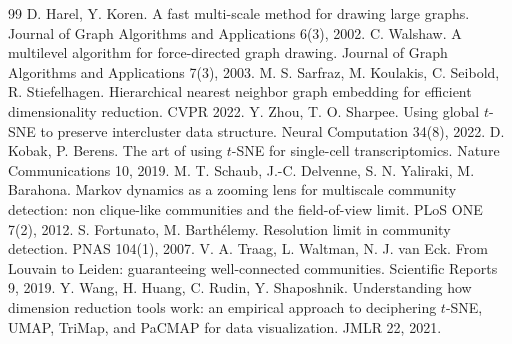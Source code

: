 \documentclass[11pt]{article}
\begin{document}
\begin{thebibliography}{99}
 D. Harel, Y. Koren. A fast multi-scale method for drawing large graphs. Journal of Graph Algorithms and Applications 6(3), 2002.
 C. Walshaw. A multilevel algorithm for force-directed graph drawing. Journal of Graph Algorithms and Applications 7(3), 2003.
 M. S. Sarfraz, M. Koulakis, C. Seibold, R. Stiefelhagen. Hierarchical nearest neighbor graph embedding for efficient dimensionality reduction. CVPR 2022.
 Y. Zhou, T. O. Sharpee. Using global $t$-SNE to preserve intercluster data structure. Neural Computation 34(8), 2022.
 D. Kobak, P. Berens. The art of using $t$-SNE for single-cell transcriptomics. Nature Communications 10, 2019.
 M. T. Schaub, J.-C. Delvenne, S. N. Yaliraki, M. Barahona. Markov dynamics as a zooming lens for multiscale community detection: non clique-like communities and the field-of-view limit. PLoS ONE 7(2), 2012.
 S. Fortunato, M. Barth\'elemy. Resolution limit in community detection. PNAS 104(1), 2007.
 V. A. Traag, L. Waltman, N. J. van Eck. From Louvain to Leiden: guaranteeing well-connected communities. Scientific Reports 9, 2019.
 Y. Wang, H. Huang, C. Rudin, Y. Shaposhnik. Understanding how dimension reduction tools work: an empirical approach to deciphering $t$-SNE, UMAP, TriMap, and PaCMAP for data visualization. JMLR 22, 2021.
\end{thebibliography}
\end{document}
